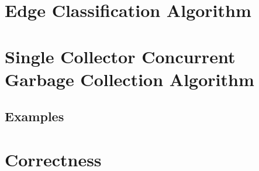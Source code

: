 \section{Edge Classification Algorithm}
\section{Single Collector Concurrent Garbage Collection Algorithm}
\subsection{Examples}
\section{Correctness}
